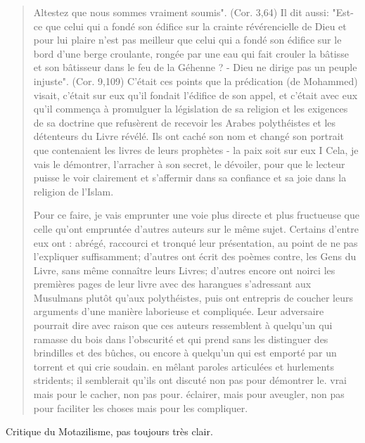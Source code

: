 \begin{quote}
Altestez que nous sommes vraiment soumis". (Cor. 3,64) Il dit aussi: "Est-ce que celui qui a fondé son édifice sur la crainte révérencielle de Dieu et pour lui plaire n'est pas meilleur que celui qui a fondé son édifice sur le bord d'une berge croulante, rongée par une eau qui fait crouler la bâtisse et son bâtisseur dans le feu de la Géhenne ? - Dieu ne dirige pas un peuple injuste". (Cor. 9,109) C'était ces points que la prédication (de Mohammed) visait, c'était sur eux qu'il fondait l'édifice de son appel, et c'était avec eux qu'il commença à promulguer la législation de sa religion et les exigences de sa doctrine que refusèrent de recevoir les Arabes polythéistes et les détenteurs du Livre révélé. Ils ont caché son nom et changé son portrait que contenaient les livres de leurs prophètes - la paix soit sur eux I Cela, je vais le démontrer, l'arracher à son secret, le dévoiler, pour que le lecteur puisse le voir clairement et s'affermir dans sa confiance et sa joie dans la religion de l'Islam.



Pour ce faire, je vais emprunter une voie plus directe et plus fructueuse que celle qu'ont empruntée d'autres auteurs sur le même sujet. Certains d'entre eux ont : abrégé, raccourci et tronqué leur présentation, au point de ne pas l'expliquer suffisamment; d'autres ont écrit des poèmes contre, les Gens du Livre, sans même connaître leurs Livres; d'autres encore ont noirci les premières pages de leur livre avec des harangues s'adressant aux Musulmans plutôt qu'aux polythéistes, puis ont entrepris de coucher leurs arguments d'une manière laborieuse et compliquée. Leur adversaire pourrait dire avec raison que ces auteurs ressemblent à quelqu'un qui ramasse du bois dans l'obscurité et qui prend sans les distinguer des brindilles et des bûches, ou encore à quelqu'un qui est emporté par un torrent et qui crie soudain. en mêlant paroles articulées et hurlements stridents; il semblerait qu'ils ont discuté non pas pour démontrer le. vrai mais pour le cacher, non pas pour. éclairer, mais pour aveugler, non pas pour faciliter les choses mais pour les compliquer.
\end{quote}
Critique du Motazilisme, pas toujours très clair. 

